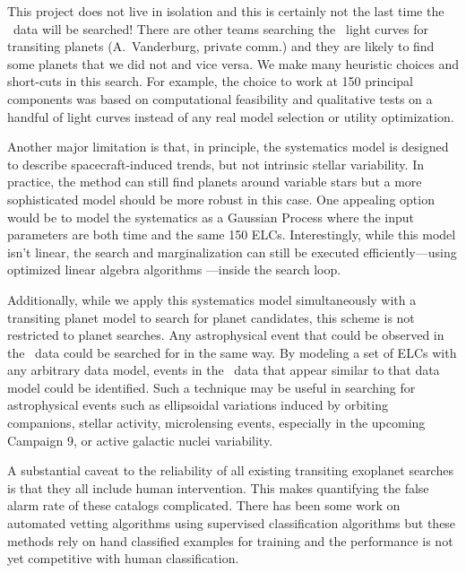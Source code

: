 This project does not live in isolation and this is certainly not the last
time the \KT\ data will be searched!
There are other teams searching the \KT\ light curves for transiting planets
(A.~Vanderburg, private comm.) and they are likely to find some planets that
we did not and vice versa.
We make many heuristic choices and short-cuts in this search.
For example, the choice to work at 150 principal components was based on
computational feasibility and qualitative tests on a handful of light curves
instead of any real model selection or utility optimization.

Another major limitation is that, in principle, the systematics model is
designed to describe spacecraft-induced trends, but not intrinsic stellar
variability.
In practice, the method can still find planets around variable stars but a
more sophisticated model should be more robust in this case.
One appealing option would be to model the systematics as a Gaussian Process
where the input parameters are both time and the same 150 ELCs.
Interestingly, while this model isn't linear, the search and marginalization
can still be executed efficiently---using optimized linear algebra algorithms
\citep[][Foreman-Mackey et al.\ in preparation]{Ambikasaran:2014}---inside the
search loop.

Additionally, while we apply this systematics model simultaneously with a
transiting planet model to search for planet candidates, this scheme is
not restricted to planet searches.
Any astrophysical event that could be observed in the \KT\ data could be
searched for in the same way.
By modeling a set of ELCs with any arbitrary data model, events in the \KT\
data that appear similar to that data model could be identified.
Such a technique may be useful in searching for astrophysical events such as
ellipsoidal variations induced by orbiting companions,
stellar activity,
microlensing events, especially in the upcoming Campaign 9,
or
active galactic nuclei variability.



A substantial caveat to the reliability of all existing transiting exoplanet
searches is that they all include human intervention.
This makes quantifying the false alarm rate of these catalogs complicated.
There has been some work on automated vetting algorithms using supervised
classification algorithms \citep{McCauliff:2014, Jenkins:2014} but these
methods rely on hand classified examples for training and the performance is
not yet competitive with human classification.

